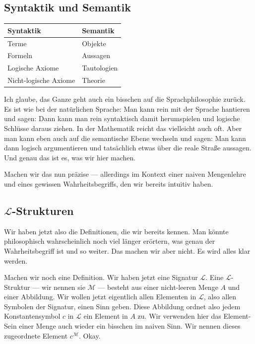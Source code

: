 \subsection{Syntaktik und Semantik}

\begin{math-stroke}
\begin{center}
\begin{tabular}{l | l}
\textbf{Syntaktik} & \textbf{Semantik} \\
\hline
Terme & Objekte \\
Formeln & Aussagen \\
Logische Axiome & Tautologien \\
Nicht-logische Axiome & Theorie
\end{tabular}
\end{center}
\end{math-stroke}

\begin{spoken-clean}[00:24:28 - 00:41:33]
Ich glaube, das Ganze geht auch ein bisschen auf die Sprachphilosophie zurück. Es ist wie bei der natürlichen Sprache: Man kann rein mit der Sprache hantieren und sagen:  Dann kann man rein syntaktisch damit herumspielen und logische Schlüsse daraus ziehen. In der Mathematik reicht das vielleicht auch oft. Aber man kann eben auch auf die semantische Ebene wechseln und sagen:  Man kann dann logisch argumentieren und tatsächlich etwas über die reale Straße aussagen. Und genau das ist es, was wir hier machen.

Machen wir das nun präzise --- allerdings im Kontext einer naiven Mengenlehre und eines gewissen Wahrheitsbegriffs, den wir bereits intuitiv haben.
\end{spoken-clean}

\subsection{\texorpdfstring{$\mathcal{L}$-Strukturen}{L-Strukturen}}

\begin{spoken-clean}[00:41:33 - 00:43:40]
Wir haben jetzt also die Definitionen, die wir bereits kennen. Man könnte philosophisch wahrscheinlich noch viel länger erörtern, was genau der Wahrheitsbegriff ist und so weiter. Das machen wir aber nicht. Es wird alles klar werden.

Machen wir noch eine Definition. Wir haben jetzt eine Signatur $\mathcal{L}$. Eine $\mathcal{L}$-Struktur --- wir nennen sie $\mathcal{M}$ --- besteht aus einer nicht-leeren Menge $A$ und einer Abbildung. Wir wollen jetzt eigentlich allen Elementen in $\mathcal{L}$, also allen Symbolen der Signatur, einen Sinn geben. Diese Abbildung ordnet also jedem Konstantensymbol $c$ in $\mathcal{L}$ ein Element in $A$ zu. Wir verwenden hier das Element-Sein einer Menge auch wieder ein bisschen im naiven Sinn. Wir nennen dieses zugeordnete Element $c^{\mathcal{M}}$. Okay.
\end{spoken-clean}

